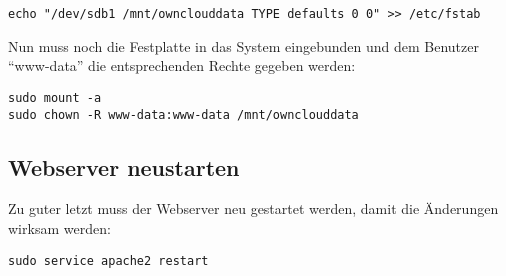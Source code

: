 \begin{lstlisting}
echo "/dev/sdb1 /mnt/ownclouddata TYPE defaults 0 0" >> /etc/fstab
\end{lstlisting}

Nun muss noch die Festplatte in das System eingebunden und dem Benutzer ``www-data'' die entsprechenden Rechte gegeben werden:

\begin{lstlisting}
sudo mount -a
sudo chown -R www-data:www-data /mnt/ownclouddata
\end{lstlisting}

\subsection{Webserver neustarten}
Zu guter letzt muss der Webserver neu gestartet werden, damit die Änderungen wirksam werden:

\begin{lstlisting}
sudo service apache2 restart
\end{lstlisting}
